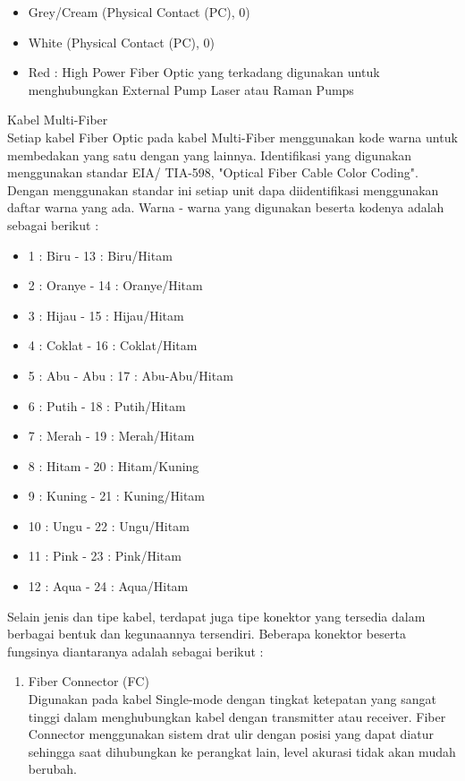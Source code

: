 \begin{flushleft}
\begin{itemize}
\begin{itemize}
		\item Grey/Cream (Physical Contact (PC), 0)
		\item White (Physical Contact (PC), 0)
		\item Red : High Power Fiber Optic yang terkadang digunakan untuk menghubungkan External Pump Laser atau Raman Pumps
	\end{itemize}
\end{itemize}
\item Kabel Multi-Fiber \\ Setiap kabel Fiber Optic pada kabel Multi-Fiber menggunakan kode warna untuk membedakan yang satu dengan yang lainnya. Identifikasi yang digunakan menggunakan standar EIA/ TIA-598, "Optical Fiber Cable Color Coding". Dengan menggunakan standar ini setiap unit dapa diidentifikasi menggunakan daftar warna yang ada. Warna - warna yang digunakan beserta kodenya adalah sebagai berikut : \\
\begin{itemize}
\item 1 : Biru - 13 : Biru/Hitam
\item 2 : Oranye - 14 : Oranye/Hitam 
\item 3 : Hijau - 15 : Hijau/Hitam 
\item 4 : Coklat - 16 : Coklat/Hitam 
\item 5 : Abu - Abu : 17 : Abu-Abu/Hitam 
\item 6 : Putih - 18 : Putih/Hitam 
\item 7 : Merah - 19 : Merah/Hitam 
\item 8 : Hitam - 20 : Hitam/Kuning 
\item 9 : Kuning - 21 : Kuning/Hitam 
\item 10 : Ungu - 22 : Ungu/Hitam 
\item 11 : Pink - 23 : Pink/Hitam 
\item 12 : Aqua - 24 : Aqua/Hitam 
\end{itemize}
Selain jenis dan tipe kabel, terdapat juga tipe konektor yang tersedia dalam berbagai bentuk dan kegunaannya tersendiri. Beberapa konektor beserta fungsinya diantaranya adalah sebagai berikut : \\
\begin{enumerate}
\item Fiber Connector (FC) \\ Digunakan pada kabel Single-mode dengan tingkat ketepatan yang sangat tinggi dalam menghubungkan kabel dengan transmitter atau receiver. Fiber Connector menggunakan sistem drat ulir dengan posisi yang dapat diatur sehingga saat dihubungkan ke perangkat lain, level akurasi tidak akan mudah berubah.

\end{enumerate}
\end{flushleft}
